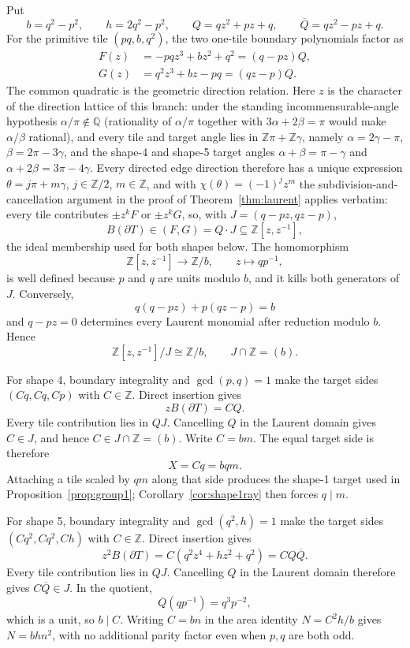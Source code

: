 \documentclass[11pt]{amsart}
\theoremstyle{definition}
\theoremstyle{remark}
\newcommand{\Z}{\mathbb Z}
\newcommand{\Q}{\mathbb Q}
\begin{document}
Put
\[
 b=q^2-p^2,\qquad h=2q^2-p^2,\qquad
 Q=qz^2+pz+q,\qquad \overline Q=qz^2-pz+q .
\]
For the primitive tile $(pq,b,q^2)$, the two one-tile boundary polynomials
factor as
\[
\begin{split}
F(z)&=-pqz^3+bz^2+q^2=(q-pz)Q,\\
G(z)&=q^2z^3+bz-pq=(qz-p)Q.
\end{split}
\]
The common quadratic is the geometric direction relation.  Here $z$ is the
character of the direction lattice of this branch: under the standing
incommensurable-angle hypothesis $\alpha/\pi\notin\Q$ (rationality of
$\alpha/\pi$ together with $3\alpha+2\beta=\pi$ would make $\alpha/\beta$
rational), and every tile and target angle lies in $\Z\pi+\Z\gamma$, namely
$\alpha=2\gamma-\pi$, $\beta=2\pi-3\gamma$, and the shape-4 and shape-5
target angles $\alpha+\beta=\pi-\gamma$ and $\alpha+2\beta=3\pi-4\gamma$.
Every directed edge direction therefore has a unique expression
$\theta=j\pi+m\gamma$, $j\in\Z/2$, $m\in\Z$, and with
$\chi(\theta)=(-1)^jz^m$ the subdivision-and-cancellation argument in the
proof of Theorem~\ref{thm:laurent} applies verbatim: every tile contributes
$\pm z^kF$ or $\pm z^kG$, so, with $J=(q-pz,qz-p)$,
\[
 B(\partial T)\in(F,G)=Q\cdot J\subseteq\Z[z,z^{-1}],
\]
the ideal membership used for both shapes below.  The homomorphism
\[
 \Z[z,z^{-1}]\longrightarrow\Z/b,\qquad z\longmapsto qp^{-1},
\]
is well defined because $p$ and $q$ are units modulo $b$, and it kills both
generators of $J$.  Conversely,
\[
        q(q-pz)+p(qz-p)=b
\]
and $q-pz=0$ determines every Laurent monomial after reduction modulo $b$.
Hence
\[
 \Z[z,z^{-1}]/J\cong\Z/b,\qquad J\cap\Z=(b).
\]

For shape 4, boundary integrality and $\gcd(p,q)=1$ make the target sides
$(Cq,Cq,Cp)$ with $C\in\Z$.  Direct insertion gives
\[
                     zB(\partial T)=CQ.
\]
Every tile contribution lies in $QJ$.  Cancelling $Q$ in the Laurent domain
gives $C\in J$, and hence $C\in J\cap\Z=(b)$.  Write $C=bm$.  The equal target
side is therefore
\[
                     X=Cq=bqm.
\]
Attaching a tile scaled by $qm$ along that side produces the shape-1 target
used in Proposition~\ref{prop:group1}; Corollary~\ref{cor:shape1ray} then
forces $q\mid m$.

For shape 5, boundary integrality and
$\gcd(q^2,h)=1$ make the target sides
$(Cq^2,Cq^2,Ch)$ with $C\in\Z$.  Direct insertion gives
\[
 z^2B(\partial T)
 =C(q^2z^4+hz^2+q^2)=C Q\overline Q.
\]
Every tile contribution lies in $QJ$.  Cancelling $Q$ in the Laurent domain
therefore gives $C\overline Q\in J$.  In the quotient,
\[
 \overline Q(qp^{-1})=q^3p^{-2},
\]
which is a unit, so $b\mid C$.  Writing $C=bn$ in the area identity
$N=C^2h/b$ gives $N=bhn^2$, with no additional parity factor even when
$p,q$ are both odd.
\end{document}

